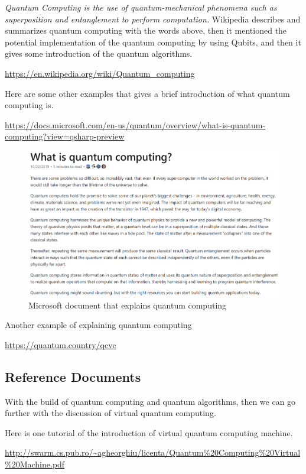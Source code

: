 \documentclass{article}
\begin{document}
\emph{Quantum Computing is the use of quantum-mechanical phenomena such as superposition and entanglement to perform computation.} Wikipedia describes and summarizes quantum computing with the words above, then it mentioned the potential implementation of the quantum computing by using Qubits, and then it gives some introduction of the quantum algorithms.



\url{https://en.wikipedia.org/wiki/Quantum\_computing} 

Here are some other examples that gives a brief introduction of what quantum computing is.

\url{https://docs.microsoft.com/en-us/quantum/overview/what-is-quantum-computing?view=qsharp-preview}

\begin{figure}[htbp]
\centerline{\includegraphics[width=\textwidth]{1.png}}
\caption{Microsoft document that explains quantum computing}
\label{fig}
\end{figure}
\newpage

Another example of explaining quantum computing

\url{https://quantum.country/qcvc}

\subsection{Reference Documents}

With the build of quantum computing and quantum algorithms, then we can go further with the discussion of virtual quantum computing.

Here is one tutorial of the introduction of virtual quantum computing machine.


\url{http://swarm.cs.pub.ro/~agheorghiu/licenta/Quantum%20Computing%20Virtual%20Machine.pdf}
\end{document}
